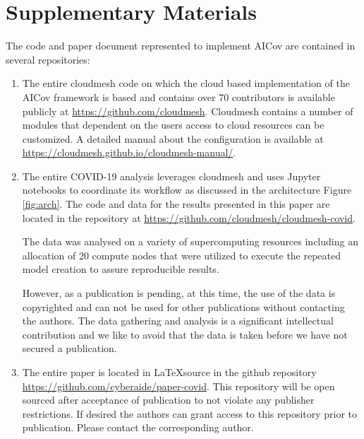 \documentclass[a4paper, inpress]{jds} %
\renewcommand{\_}{%
    \textunderscore\hspace{0pt}%
}
\begin{document}

%
%

\section*{Supplementary Materials}

The code and paper document represented to implement AICov are contained in several repositories:

\begin{enumerate}
    \item The entire cloudmesh code on which the cloud based implementation of the AICov framework is based and contains over 70 contributors is available publicly at \url{https://github.com/cloudmesh}. Cloudmesh contains a number of modules that dependent on the users access to cloud resources can be customized. A detailed manual about the configuration is available at \url{https://cloudmesh.github.io/cloudmesh-manual/}.
    
    \item The entire COVID-19 analysis leverages cloudmesh and uses Jupyter notebooks to coordinate its workflow as discussed in the architecture Figure \ref{fig:arch}. The code and data for the results presented in this paper are located in the repository at \url{https://github.com/cloudmesh/cloudmesh-covid}.
    
    The data was analysed on a variety of supercomputing resources including an allocation of 20 compute nodes that were utilized to execute the  repeated model creation to assure reproducible results.
    
    However, as a publication is pending, at this time, the use of the data is copyrighted and can not be used for other publications without contacting the authors. The data gathering and analysis is a significant intellectual contribution and we like to avoid that the data is taken before we have not secured a publication. 
    
    \item The entire paper is located in \LaTeX source in the github repository \url{https://github.com/cyberaide/paper-covid}. This repository will be open sourced after acceptance of publication to not violate any publisher restrictions. If desired the authors can grant access to this repository prior to publication. Please contact the corresponding author.
    
\end{enumerate}
\end{document}
